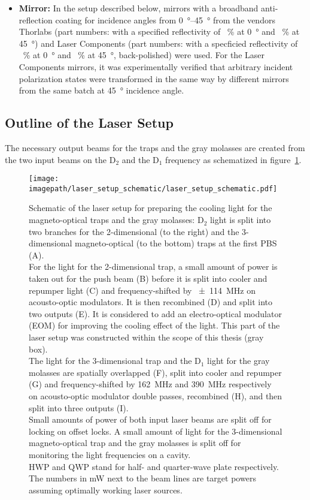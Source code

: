\begin{itemize}
    \item \textbf{Mirror:} In the setup described below, mirrors with a broadband anti-reflection coating for incidence angles from \SIrange[]{0}{45}{\degree} from the vendors Thorlabs (part numbers: with a specified reflectivity of \SI[]{}{\percent} at \SI[]{0}{\degree} and \SI[]{}{\percent} at \SI[]{45}{\degree}) and Laser Components (part numbers: with a specficied reflectivity of \SI[]{}{\percent} at \SI[]{0}{\degree} and \SI[]{}{\percent} at \SI[]{45}{\degree}, back-polished) were used.  For the Laser Components mirrors, it was experimentally verified that arbitrary incident polarization states were transformed in the same way by different mirrors from the same batch at \SI[]{45}{\degree} incidence angle.
\end{itemize}

\subsection*{Outline of the Laser Setup}
The necessary output beams for the traps and the gray molasses are created from the two input beams on the D$_2$ and the D$_1$ frequency as schematized in figure~\ref{fig:laser_setup_schematic}.

\begin{figure}
    \centering
    \texttt{[image: \\imagepath/laser\_setup\_schematic/laser\_setup\_schematic.pdf]}
    \caption{Schematic of the laser setup for preparing the cooling light for the magneto-optical traps and the gray molasses: D$_2$ light is split into two branches for the 2-dimensional (to the right) and the 3-dimensional magneto-optical (to the bottom) traps at the first PBS (A).\\
    For the light for the 2-dimensional trap, a small amount of power is taken out for the push beam (B) before it is split into cooler and repumper light (C) and frequency-shifted by \SI[]{+-114}{\mega\hertz} on acousto-optic modulators. It is then recombined (D) and split into two outputs (E). It is considered to add an electro-optical modulator (EOM) for improving the cooling effect of the light. This part of the laser setup was constructed within the scope of this thesis (gray box).\\
    The light for the 3-dimensional trap and the D$_1$ light for the gray molasses are spatially overlapped (F), split into cooler and repumper (G) and frequency-shifted by  \SI[]{+162}{\mega\hertz} and \SI[]{+390}{\mega\hertz} respectively on acousto-optic modulator double passes, recombined (H), and then split into three outputs (I).\\
    Small amounts of power of both input laser beams are split off for locking on offset locks. A small amount of light for the 3-dimensional magneto-optical trap and the gray molasses is split off for monitoring the light frequencies on a cavity.\\
    HWP and QWP stand for half- and quarter-wave plate respectively. The numbers in \si[]{\milli\watt} next to the beam lines are target powers assuming optimally working laser sources.}
    \label{fig:laser_setup_schematic}
\end{figure}

